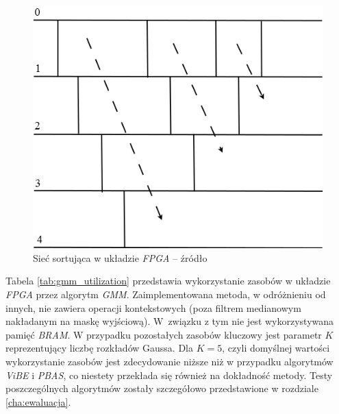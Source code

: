 	\begin{figure}[h!]
		\centering
		\includegraphics[scale=0.4]{img/4/sort_module.png}
		\caption{Sieć sortująca w układzie \textit{FPGA} -- źródło \cite{piszczek_15}}
		\label{fig:gmm_sort}
	\end{figure}	


Tabela \ref{tab:gmm_utilization} przedstawia wykorzystanie zasobów w układzie \textit{FPGA} przez algorytm \textit{GMM}. 
Zaimplementowana metoda, w odróżnieniu od innych, nie zawiera operacji kontekstowych (poza filtrem medianowym nakładanym na maskę wyjściową). W~związku z tym nie jest wykorzystywana pamięć \textit{BRAM}. 
W przypadku pozostałych zasobów kluczowy jest parametr $K$ reprezentujący liczbę rozkładów Gaussa. 
Dla $K=5$, czyli domyślnej wartości wykorzystanie zasobów jest zdecydowanie niższe niż w przypadku algorytmów \textit{ViBE} i \textit{PBAS}, co niestety przekłada się również na dokładność metody. 
Testy poszczególnych algorytmów zostały szczegółowo przedstawione w rozdziale \ref{cha:ewaluacja}.

